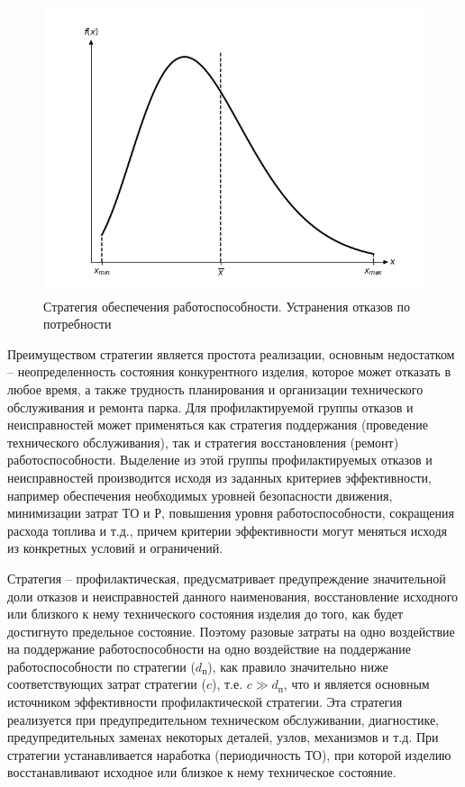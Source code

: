 \documentclass[../nirs.tex]{subfiles}
\begin{document}
\begin{figure}[H]
\centering
\includegraphics[keepaspectratio,width=\textwidth]{./images/pdf.a.png}
\caption{Стратегия обеспечения работоспособности. Устранения отказов по
    потребности}
\label{fig:pdf.a}
\end{figure}

Преимуществом стратегии  является простота реализации, основным
недостатком -- неопределенность состояния конкурентного изделия, которое может
отказать в любое время, а также трудность планирования и организации
технического обслуживания и ремонта парка. Для профилактируемой группы отказов и
неисправностей может применяться как стратегия поддержания (проведение
технического обслуживания), так и стратегия восстановления (ремонт)
работоспособности. Выделение из этой группы профилактируемых отказов и
неисправностей производится исходя из заданных критериев эффективности, например
обеспечения необходимых уровней безопасности движения, минимизации затрат ТО и
Р, повышения уровня работоспособности, сокращения расхода топлива и т.д., причем
критерии эффективности могут меняться исходя из конкретных условий и
ограничений.

Стратегия  -- профилактическая, предусматривает предупреждение
значительной доли отказов и неисправностей данного наименования, восстановление
исходного или близкого к нему технического состояния изделия до того, как будет
достигнуто предельное состояние. Поэтому разовые затраты на одно воздействие на
поддержание работоспособности на одно воздействие на поддержание
работоспособности по стратегии  ($d_{\text{п}}$), как правило значительно
ниже соответствующих затрат стратегии  ($c$), т.е. $c \gg d_{\text{п}}$,
что и является основным источником эффективности профилактической стратегии. Эта
стратегия реализуется при предупредительном техническом обслуживании,
диагностике, предупредительных заменах некоторых деталей, узлов, механизмов и
т.д. При стратегии  устанавливается наработка (периодичность ТО), при
которой изделию восстанавливают исходное или близкое к нему техническое
состояние.
\end{document}
